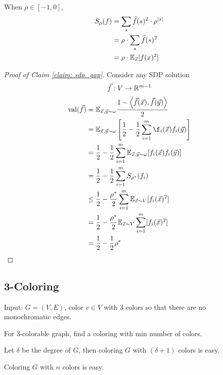 \begin{claim}
    When  $ \rho\in [-1,0] $, 
    \[\begin{aligned}
        S_\rho(f)&=\sum_{s}\widehat{f}(s)^2\cdot \rho^{|s|}\\
        &=\rho\cdot\sum_{s}\widehat{f}(s)^2\\
        &=\rho \cdot \mathbb E_{\vec{x}}[f(x)^2]
    \end{aligned}\] 
\end{claim}

\begin{proof}[Proof of Claim \ref{claim: sdp_gap}]
    Consider any  SDP solution 
    \[\vec{f}:V\rightarrow \mathbb R^{m-1}\]
    \[\begin{aligned}
        \mathrm{val}(\vec{f})&=\Ebb_{\vec{x},\vec{y}\sim \omega}\frac{1-\<\vec{f}(\vec{x}),\vec{f}(\vec{y})\>}{2}\\
        &=\Ebb_{\vec{x},\vec{y}\sim \omega}\left[\frac{1}{2}-\frac{1}{2}\sum_{i=1}^m\f_i(\vec{x})f_i(\vec{y})\right]\\
        &=\frac{1}{2}-\frac{1}{2}\sum_{i=1}^m\Ebb_{\vec{x},\vec{y}\sim \omega}[f_i(\vec{x})f_i(\vec{y})]\\
        &=\frac{1}{2}-\frac{1}{2}\sum_{i=1}^mS_{\rho^*}(f_i)\\
        & \leq \frac{1}{2}-\frac{\rho^*}{2}\sum_{i=1}^m\Ebb_{\vec{x}\sim V}[f_i(\vec{x})^2]\\
        &=\frac{1}{2}-\frac{\rho^*}{2}\Ebb_{\vec{x}\sim V}\sum_{i=1}^m[f_i(\vec{x})^2]\\
        &=\frac{1}{2}-\frac{1}{2}\rho^*
    \end{aligned}\] 
\end{proof}

\subsection{3-Coloring}
\begin{example}[3-Coloring]
    Input:  $ G=(V,E) $, color  $ v\in V $ with  $ 3 $ colors so that there are no monochromatic edges.
\end{example}
\begin{example}
    For  $ 3 $-colorable graph, find a coloring with min number of colors. 
\end{example}

\begin{lemma}
    Let  $ \delta $ be the degree of  $ G  $, then coloring  $ G  $ with  $ (\delta+1) $ colors is easy.  
\end{lemma}
\begin{claim}
    Coloring  $ G  $ with  $ n  $ colors is easy.
\end{claim}

